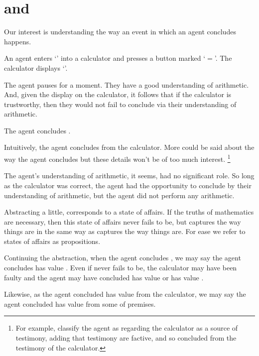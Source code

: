 \chapter{\qWhy{} and \qHow{}}
\label{cha:intro}

\begin{note}
  Our interest is understanding the way an event in which an agent concludes happens.

  \begin{scenario}[Multiplication]%
    \label{illu:gist:calc}%
    An agent enters `\gistCalcLHS{}' into a calculator and presses a button marked `\(=\)'.
    The calculator displays `\gistCalcRHS{}'.

    The agent pauses for a moment.
    They have a good understanding of arithmetic.
    And, given the display on the calculator, it follows that if the calculator is trustworthy, then they would not fail to conclude \propM{\gistCalcEq{}} via their understanding of arithmetic.

    The agent concludes \propM{\gistCalcEq{}}.
  \end{scenario}

  \noindent%
  Intuitively, the agent concludes \propM{\gistCalcEq{}} from the calculator.
  More could be said about the way the agent concludes but these details won't be of too much interest.%
  \footnote{
    For example, classify the agent as regarding the calculator as a source of testimony, adding that testimony are factive, and so concluded \propM{\gistCalcEq{}} from the testimony of the calculator.
  }

  The agent's understanding of arithmetic, it seems, had no significant role.
  So long as the calculator was correct, the agent had the opportunity to conclude \propM{\gistCalcEq{}} by their understanding of arithmetic, but the agent did not perform any arithmetic.
\end{note}

\begin{note}
  Abstracting a little, \propM{\gistCalcEq{}} corresponds to a state of affairs.
  If the truths of mathematics are necessary, then this state of affairs never fails to be, but \propM{\gistCalcEq{}} captures the way things are in the same way as  captures the way things are.
  For ease we refer to states of affairs as propositions.

  Continuing the abstraction, when the agent concludes \propM{\gistCalcEq{}}, we may say the agent concludes \propM{\gistCalcEq{}} has value .
  Even if \propM{\gistCalcEq{}} never fails to be, the calculator may have been faulty and the agent may have concluded \propM{\gistCalcEqBad{}} has value  or \propM{\gistCalcEq{}} has value .

  Likewise, as the agent concluded \propM{\gistCalcEq{}} has value  from the calculator, we may say the agent concluded \propM{\gistCalcEq{}} has value  from some \pool{} of premises.
\end{note}

